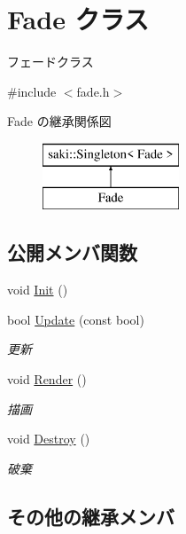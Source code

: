 \hypertarget{class_fade}{}\section{Fade クラス}
\label{class_fade}


フェードクラス  




{\ttfamily \#include $<$fade.\+h$>$}

Fade の継承関係図\begin{figure}[H]
\begin{center}
\leavevmode
\includegraphics[height=2.000000cm]{class_fade}
\end{center}
\end{figure}
\subsection*{公開メンバ関数}
\begin{DoxyCompactItemize}
\item 
void \mbox{\hyperlink{class_fade_ac2a47819e1390abcae3259bcb42bddf5}{Init}} ()
\item 
bool \mbox{\hyperlink{class_fade_aaf97d1ac502c86612a97fde0e2fbf308}{Update}} (const bool)
\begin{DoxyCompactList}\small\item\em 更新 \end{DoxyCompactList}\item 
void \mbox{\hyperlink{class_fade_abfe024be1a10d4849582adf58fe6682a}{Render}} ()
\begin{DoxyCompactList}\small\item\em 描画 \end{DoxyCompactList}\item 
void \mbox{\hyperlink{class_fade_afd5cce157c2876a800ea59b2648547c2}{Destroy}} ()
\begin{DoxyCompactList}\small\item\em 破棄 \end{DoxyCompactList}\end{DoxyCompactItemize}
\subsection*{その他の継承メンバ}


